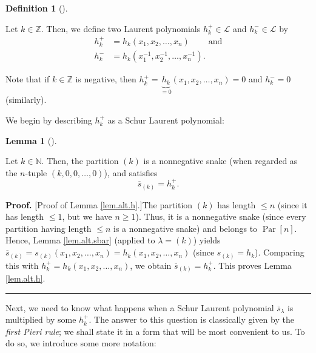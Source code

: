 \documentclass[numbers=enddot,12pt,final,onecolumn,notitlepage]{scrartcl}%
\theoremstyle{definition}
\newtheorem{lem}[theo]{Lemma}
\newenvironment{lemma}[1][]
{\begin{lem}[#1]\begin{leftbar}}
{\end{leftbar}\end{lem}}
\newtheorem{defi}[theo]{Definition}
\newenvironment{definition}[1][]
{\begin{defi}[#1]\begin{leftbar}}
{\end{leftbar}\end{defi}}
\newenvironment{proof}[1][Proof]{\noindent\textbf{#1.} }{\ \rule{0.5em}{0.5em}}
\begin{document}
\begin{definition}
\label{def.hkpm}Let $k\in\mathbb{Z}$. Then, we define two Laurent polynomials
$h_{k}^{+}\in\mathcal{L}$ and $h_{k}^{-}\in\mathcal{L}$ by%
\begin{align*}
h_{k}^{+}  &  =h_{k}\left(  x_{1},x_{2},\ldots,x_{n}\right)
\ \ \ \ \ \ \ \ \ \ \text{and}\\
h_{k}^{-}  &  =h_{k}\left(  x_{1}^{-1},x_{2}^{-1},\ldots,x_{n}^{-1}\right)  .
\end{align*}

\end{definition}

Note that if $k\in\mathbb{Z}$ is negative, then $h_{k}^{+}=\underbrace{h_{k}%
}_{=0}\left(  x_{1},x_{2},\ldots,x_{n}\right)  =0$ and $h_{k}^{-}=0$ (similarly).

We begin by describing $h_{k}^{+}$ as a Schur Laurent polynomial:

\begin{lemma}
\label{lem.alt.h}Let $k\in\mathbb{N}$. Then, the partition $\left(  k\right)
$ is a nonnegative snake (when regarded as the $n$-tuple $\left(
k,0,0,\ldots,0\right)  $), and satisfies%
\[
\overline{s}_{\left(  k\right)  }=h_{k}^{+}.
\]

\end{lemma}

\begin{proof}
[Proof of Lemma \ref{lem.alt.h}.]The partition $\left(  k\right)  $ has length
$\leq n$ (since it has length $\leq1$, but we have $n\geq1$). Thus, it is a
nonnegative snake (since every partition having length $\leq n$ is a
nonnegative snake) and belongs to $\operatorname*{Par}\left[  n\right]  $.
Hence, Lemma \ref{lem.alt.sbar} (applied to $\lambda=\left(  k\right)  $)
yields $\overline{s}_{\left(  k\right)  }=s_{\left(  k\right)  }\left(
x_{1},x_{2},\ldots,x_{n}\right)  =h_{k}\left(  x_{1},x_{2},\ldots
,x_{n}\right)  $ (since $s_{\left(  k\right)  }=h_{k}$). Comparing this with
$h_{k}^{+}=h_{k}\left(  x_{1},x_{2},\ldots,x_{n}\right)  $, we obtain
$\overline{s}_{\left(  k\right)  }=h_{k}^{+}$. This proves Lemma
\ref{lem.alt.h}.
\end{proof}

Next, we need to know what happens when a Schur Laurent polynomial
$\overline{s}_{\lambda}$ is multiplied by some $h_{k}^{+}$. The answer to this
question is classically given by the \textit{first Pieri rule}; we shall state
it in a form that will be most convenient to us. To do so, we introduce some
more notation:
\end{document}

